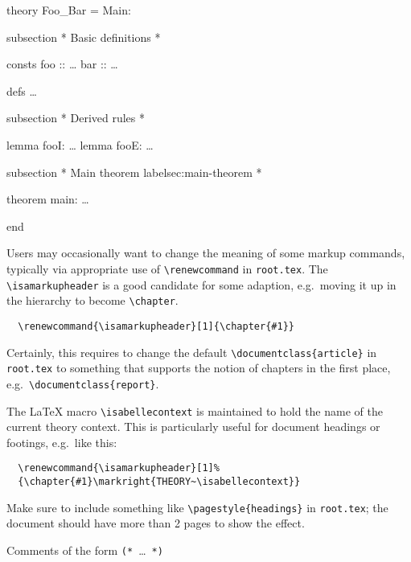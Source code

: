\begin{isabellebody}
\begin{isamarkuptext}
\begin{ttbox}
  theory Foo_Bar = Main:

  subsection {\ttlbrace}* Basic definitions *{\ttrbrace}

  consts
    foo :: \dots
    bar :: \dots

  defs \dots

  subsection {\ttlbrace}* Derived rules *{\ttrbrace}

  lemma fooI: \dots
  lemma fooE: \dots

  subsection {\ttlbrace}* Main theorem {\ttback}label{\ttlbrace}sec:main-theorem{\ttrbrace} *{\ttrbrace}

  theorem main: \dots

  end
  \end{ttbox}

  Users may occasionally want to change the meaning of some markup
  commands, typically via appropriate use of \verb,\renewcommand, in
  \texttt{root.tex}.  The \verb,\isamarkupheader, is a good candidate
  for some adaption, e.g.\ moving it up in the hierarchy to become
  \verb,\chapter,.

\begin{verbatim}
  \renewcommand{\isamarkupheader}[1]{\chapter{#1}}
\end{verbatim}

  Certainly, this requires to change the default
  \verb,\documentclass{article}, in \texttt{root.tex} to something
  that supports the notion of chapters in the first place, e.g.\
  \verb,\documentclass{report},.

  \medskip The {\LaTeX} macro \verb,\isabellecontext, is maintained to
  hold the name of the current theory context.  This is particularly
  useful for document headings or footings, e.g.\ like this:

\begin{verbatim}
  \renewcommand{\isamarkupheader}[1]%
  {\chapter{#1}\markright{THEORY~\isabellecontext}}
\end{verbatim}

  \noindent Make sure to include something like
  \verb,\pagestyle{headings}, in \texttt{root.tex}; the document
  should have more than 2 pages to show the effect.%
\end{isamarkuptext}%
\isamarkuptrue%
%
\isamarkuptrue%
%
\begin{isamarkuptext}%
Comments of the form \verb,(,\verb,*,~\dots~\verb,*,\verb,),


\end{isamarkuptext}
\end{isabellebody}
